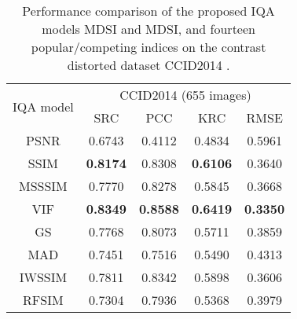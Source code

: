 \begin{table}[htb]
\scriptsize
\centering
\caption{Performance comparison of the proposed IQA models MDSI and MDSI, and fourteen popular/competing indices on the contrast distorted dataset CCID2014 \cite{CCID2014}.}
\label{resultsC}
\begin{tabular}{c|cccc}
\hline
\multirow{2}{*}{IQA model}    & \multicolumn{4}{c}{CCID2014 (655 images)}                                                                                                             \\ \cline{2-5} 
                              & SRC                                 & PCC                                 & KRC                                 & RMSE                                \\ \hline
PSNR                          & 0.6743                              & 0.4112                              & 0.4834                              & 0.5961                              \\
SSIM \cite{SSIM}                          & \textbf{0.8174}                     & 0.8308                              & \textbf{0.6106}                     & 0.3640                              \\
MSSSIM \cite{MSSSIM}                       & 0.7770                              & 0.8278                              & 0.5845                              & 0.3668                              \\
VIF \cite{VIF}                           & \textbf{0.8349}                     & \textbf{0.8588}                     & \textbf{0.6419}                     & \textbf{0.3350}                     \\
GS \cite{GS}                            & 0.7768                              & 0.8073                              & 0.5711                              & 0.3859                              \\
MAD \cite{MAD}                           & 0.7451                              & 0.7516                              & 0.5490                              & 0.4313                              \\
IWSSIM \cite{IWSSIM}                        & 0.7811                              & 0.8342                              & 0.5898                              & 0.3606                              \\
RFSIM \cite{RFSIM}                         & 0.7304                              & 0.7936                              & 0.5368                              & 0.3979                              \\

\end{tabular}
\end{table}
